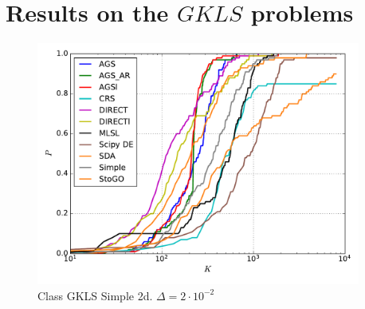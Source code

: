 \documentclass[a4paper]{article}
\begin{document}
\section{Results on the $GKLS$ problems}

\begin{figure}[H]
  \center
  \includegraphics[width=0.95\textwidth]{../experiments/gklss2d/cmc.pdf}
  \caption{Class GKLS Simple 2d. $\Delta=2\cdot10^{-2}$}
\end{figure}
\end{document}
